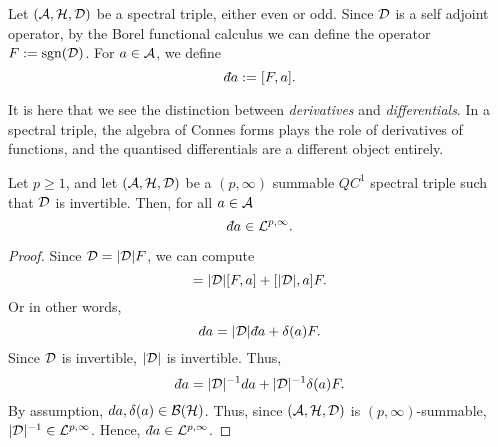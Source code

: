 \begin{definition}
    Let $(\mathcal{A},\mathcal{H},\mathcal{D})$ be a spectral triple, either even or odd. Since $\mathcal{D}$
    is a self adjoint operator, by the Borel functional calculus
    we can define the operator $F := \operatorname{sgn}(\mathcal{D})$. For $a \in \mathcal{A}$, we define
    \begin{equation}
        \qd a := [F,a].
    \end{equation}
\end{definition}

It is here that we see the distinction between \emph{derivatives}
and \emph{differentials}. In a spectral triple, the algebra
of Connes forms plays the role of derivatives of functions, and the quantised
differentials are a different object entirely.

\begin{theorem}
    Let $p \geq 1$, and
    let $(\mathcal{A},\mathcal{H},\mathcal{D})$ be a $(p,\infty)$ summable $QC^1$ spectral triple such that $\mathcal{D}$
    is invertible. Then, for all $a \in \mathcal{A}$
    \begin{equation}
        \qd a \in \mathcal{L}^{p,\infty}.
    \end{equation}
\end{theorem}
\begin{proof}
    Since $\mathcal{D} = |\mathcal{D}|F$, we can compute
    \begin{equation}
        [\D,a] = |\D|[F,a] + [|\D|,a]F.
    \end{equation}
    Or in other words,
    \begin{equation}
        da = |\D|\qd a + \delta(a)F.
    \end{equation}
    Since $\mathcal{D}$ is invertible, $|\mathcal{D}|$ is invertible. Thus,
    \begin{equation*}
        \qd a = |\D|^{-1}da + |\D|^{-1}\delta(a)F.
    \end{equation*}
    By assumption, $da,\delta(a) \in \mathcal{B}(\mathcal{H})$. Thus,
    since $(\mathcal{A},\mathcal{H},\mathcal{D})$ is $(p,\infty)$-summable, $|\mathcal{D}|^{-1} \in \mathcal{L}^{p,\infty}$.
    Hence, $\qd a \in \mathcal{L}^{p,\infty}$.
\end{proof} 

